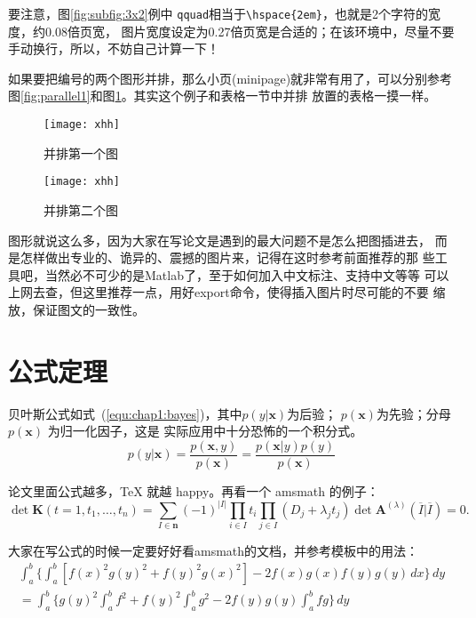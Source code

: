 要注意，图\ref{fig:subfig:3x2}例中
\texttt{qquad}相当于\verb|\hspace{2em}|，也就是2个字符的宽度，约0.08倍页宽，
图片宽度设定为0.27倍页宽是合适的；在该环境中，尽量不要手动换行，所以，不妨自己计算一下！

如果要把编号的两个图形并排，那么小页(minipage)就非常有用了，可以分别参考
图\ref{fig:parallel1}和图\ref{fig:parallel2}。其实这个例子和表格一节中并排
放置的表格一摸一样。
\begin{figure}[htb]
\begin{minipage}{0.48\textwidth}
  \centering
  \texttt{[image: xhh]}
  \caption{并排第一个图}
  \label{fig:parallel1}
\end{minipage}\hfill
\begin{minipage}{0.48\textwidth}
  \centering
  \texttt{[image: xhh]}
  \caption{并排第二个图}
  \label{fig:parallel2}
\end{minipage}
\end{figure}

图形就说这么多，因为大家在写论文是遇到的最大问题不是怎么把图插进去，
而是怎样做出专业的、诡异的、震撼的图片来，记得在这时参考前面推荐的那
些工具吧，当然必不可少的是Matlab了，至于如何加入中文标注、支持中文等等
可以上网去查，但这里{\kai 推荐一点}，用好export命令，使得插入图片时尽可能的不要
缩放，保证图文的一致性。

\section{公式定理}
\label{sec:equation}
贝叶斯公式如式~(\ref{equ:chap1:bayes})，其中$p(y|\mathbf{x})$为后验；
$p(\mathbf{x})$为先验；分母$p(\mathbf{x})$ 为归一化因子，这是
实际应用中十分恐怖的一个积分式。
\begin{equation}
\label{equ:chap1:bayes}
p(y|\mathbf{x}) = \frac{p(\mathbf{x},y)}{p(\mathbf{x})}=
\frac{p(\mathbf{x}|y)p(y)}{p(\mathbf{x})} 
\end{equation}

论文里面公式越多，\TeX{} 就越 happy。再看一个 \textsf{amsmath} 的例子：
\newcommand{\envert}[1]{\left\lvert#1\right\rvert} 
\begin{equation}\label{detK2}
\det\mathbf{K}(t=1,t_1,\dots,t_n)=\sum_{I\in\mathbf{n}}(-1)^{\envert{I}}
\prod_{i\in I}t_i\prod_{j\in I}(D_j+\lambda_jt_j)\det\mathbf{A}
^{(\lambda)}(\overline{I}|\overline{I})=0.
\end{equation} 

大家在写公式的时候一定要好好看\textsf{amsmath}的文档，并参考模板中的用法：
\begin{multline*}%
\int_a^b\biggl\{\int_a^b[f(x)^2g(y)^2+f(y)^2g(x)^2]
 -2f(x)g(x)f(y)g(y)\,dx\biggr\}\,dy \\
 =\int_a^b\biggl\{g(y)^2\int_a^bf^2+f(y)^2
  \int_a^b g^2-2f(y)g(y)\int_a^b fg\biggr\}\,dy
\end{multline*}

